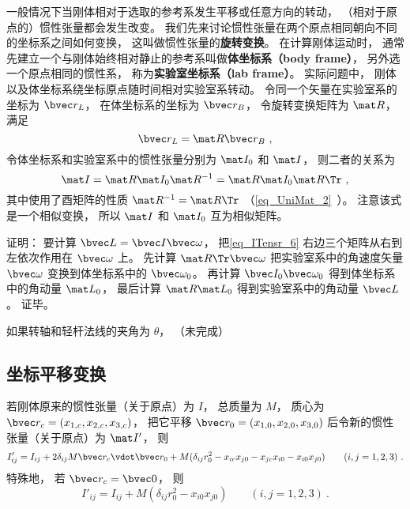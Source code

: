 一般情况下当刚体相对于选取的参考系发生平移或任意方向的转动， （相对于原点的）惯性张量都会发生改变。  我们先来讨论惯性张量在两个原点相同朝向不同的坐标系之间如何变换， 这叫做惯性张量的\textbf{旋转变换}。 在计算刚体运动时， 通常先建立一个与刚体始终相对静止的参考系叫做\textbf{体坐标系（body frame）}， 另外选一个原点相同的惯性系， 称为\textbf{实验室坐标系（lab frame）}。 实际问题中， 刚体以及体坐标系绕坐标原点随时间相对实验室系转动。 令同一个矢量在实验室系的坐标为 $\bvec r_{L}$， 在体坐标系的坐标为 $\bvec r_{B}$， 令旋转变换矩阵为 $\mat R$， 满足
\begin{equation}
\bvec r_L = \mat R\bvec r_B~,
\end{equation}
令体坐标系和实验室系中的惯性张量分别为 $\mat I_0$ 和 $\mat I$， 则二者的关系为
\begin{equation}\label{eq_ITensr_6}
\mat I = \mat R \mat I_0 \mat R^{-1} = \mat R \mat I_0 \mat R\Tr~,
\end{equation}
其中使用了酉矩阵的性质 $\mat R^{-1} = \mat R\Tr$ （\autoref{eq_UniMat_2}~）。 注意该式是一个相似变换， 所以 $\mat I$ 和 $\mat I_0$ 互为相似矩阵。

证明： 要计算 $\bvec L = \bvec I \bvec \omega$， 把\autoref{eq_ITensr_6} 右边三个矩阵从右到左依次作用在 $\bvec \omega$ 上。 先计算 $\mat R\Tr \bvec \omega$ 把实验室系中的角速度矢量 $\bvec \omega$ 变换到体坐标系中的 $\bvec \omega_0$。 再计算 $\bvec I_0 \bvec \omega_0$ 得到体坐标系中的角动量 $\mat L_0$， 最后计算 $\mat R \mat L_0$ 得到实验室系中的角动量 $\bvec L$。 证毕。

\begin{example}{}
如果转轴和轻杆法线的夹角为 $\theta$， （未完成）
\end{example}

\subsection{坐标平移变换}
若刚体原来的惯性张量（关于原点）为 $I$， 总质量为 $M$， 质心为 $\bvec r_c = (x_{1,c}, x_{2,c}, x_{3,c})$， 把它平移 $\bvec r_0 = (x_{1,0}, x_{2,0}, x_{3,0})$ 后令新的惯性张量（关于原点）为 $\mat I'$， 则
\begin{equation}\label{eq_ITensr_7}
I'_{ij} = I_{ij} + 2 \delta_{ij} M\bvec r_c\vdot \bvec r_0 + M(\delta_{ij}r_0^2 - x_{ic}x_{j0} - x_{jc}x_{i0} - x_{i0}x_{j0})\qquad (i, j = 1, 2, 3)~.
\end{equation}
特殊地， 若 $\bvec r_c = \bvec 0$， 则
\begin{equation}
I'_{ij} = I_{ij} + M(\delta_{ij}r_0^2 - x_{i0}x_{j0})\qquad (i, j = 1, 2, 3)~.
\end{equation}


